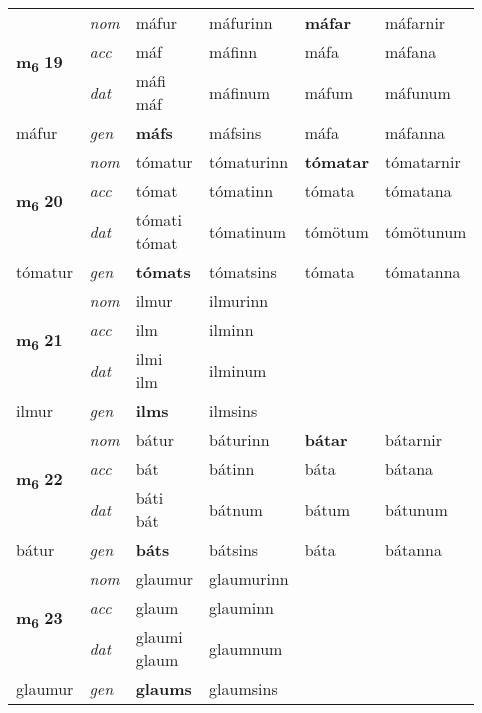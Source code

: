 \begin{longtable}[l]{X>{\footnotesize\itshape}XXXXX}
\multirow{3}{*}{{{\textbf{m{\textsubscript{6}}} \Large{\textbf{19}}}}} & nom & máfur & máfurinn & \textbf{máfar} & máfarnir \\*
 & acc & máf & máfinn & máfa & máfana \\*
 & dat & \specialcell{máfi\\ máf} & máfinum & máfum & máfunum \\*
 {\footnotesize{máfur}} & gen & \textbf{máfs} & máfsins & máfa & máfanna \\
\midrule

\multirow{3}{*}{{{\textbf{m{\textsubscript{6}}} \Large{\textbf{20}}}}} & nom & tómatur & tómaturinn & \textbf{tómatar} & tómatarnir \\*
 & acc & tómat & tómatinn & tómata & tómatana \\*
 & dat & \specialcell{tómati\\ tómat} & tómatinum & tómötum & tómötunum \\*
 {\footnotesize{tómatur}} & gen & \textbf{tómats} & tómatsins & tómata & tómatanna \\
\midrule

\multirow{3}{*}{{{\textbf{m{\textsubscript{6}}} \Large{\textbf{21}}}}} & nom & ilmur & ilmurinn & \textbf{} &  \\*
 & acc & ilm & ilminn &  &  \\*
 & dat & \specialcell{ilmi\\ ilm} & ilminum &  &  \\*
 {\footnotesize{ilmur}} & gen & \textbf{ilms} & ilmsins &  &  \\
\midrule

\multirow{3}{*}{{{\textbf{m{\textsubscript{6}}} \Large{\textbf{22}}}}} & nom & bátur & báturinn & \textbf{bátar} & bátarnir \\*
 & acc & bát & bátinn & báta & bátana \\*
 & dat & \specialcell{báti\\ bát} & bátnum & bátum & bátunum \\*
 {\footnotesize{bátur}} & gen & \textbf{báts} & bátsins & báta & bátanna \\
\midrule

\multirow{3}{*}{{{\textbf{m{\textsubscript{6}}} \Large{\textbf{23}}}}} & nom & glaumur & glaumurinn & \textbf{} &  \\*
 & acc & glaum & glauminn &  &  \\*
 & dat & \specialcell{glaumi\\ glaum} & glaumnum &  &  \\*
 {\footnotesize{glaumur}} & gen & \textbf{glaums} & glaumsins &  &  \\
\midrule


\end{longtable}

